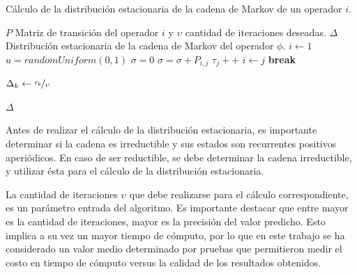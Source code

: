 \begin{algorithm}[!t]
	\caption{Cálculo de la distribución estacionaria de la cadena de Markov de un operador $i$.}
	\label{alg:distEstacionaria}
	\begin{algorithmic}[1]
	\REQUIRE $P$ Matriz de transición del operador $i$ y $\upsilon$ cantidad de iteraciones deseadas.
	\ENSURE $\Delta$ Distribución estacionaria de la cadena de Markov del operador $\phi$.
	\STATE $i \leftarrow 1$
		\STATE $u = randomUniform(0,1)$
		\STATE $\sigma = 0$
			\STATE $\sigma = \sigma + P_{i,j}$
				\STATE $\tau_{j}++$
				\STATE $i \leftarrow j$
				\STATE \textbf{break}
			\ENDIF
		\ENDFOR
	\ENDFOR

		\STATE $\Delta_{k} \leftarrow \nicefrac{\tau_{k}}{\upsilon}$
	\ENDFOR	
	
	\RETURN $\Delta$
	
	\end{algorithmic}
\end{algorithm}


\normalsize{Antes de realizar el cálculo de la distribución estacionaria, es importante determinar si la cadena es irreductible y sus estados son recurrentes positivos aperiódicos. En caso de ser reductible, se debe determinar la cadena irreductible, y utilizar ésta para el cálculo de la distribución estacionaria.}

La cantidad de iteraciones $\upsilon$ que debe realizarse para el cálculo correspondiente, es un parámetro entrada del algoritmo. Es importante destacar que entre mayor es la cantidad de iteraciones, mayor es la precisión del valor predicho. Esto implica a su vez un mayor tiempo de cómputo, por lo que en este trabajo se ha considerado un valor medio determinado por pruebas que permitieron medir el costo en tiempo de cómputo versus la calidad de los resultados obtenidos.

